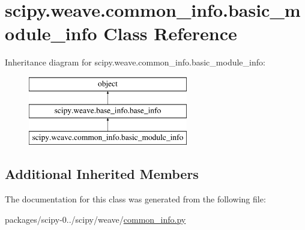 \hypertarget{classscipy_1_1weave_1_1common__info_1_1basic__module__info}{}\section{scipy.\+weave.\+common\+\_\+info.\+basic\+\_\+module\+\_\+info Class Reference}
\label{classscipy_1_1weave_1_1common__info_1_1basic__module__info}
Inheritance diagram for scipy.\+weave.\+common\+\_\+info.\+basic\+\_\+module\+\_\+info\+:\begin{figure}[H]
\begin{center}
\leavevmode
\includegraphics[height=3.000000cm]{classscipy_1_1weave_1_1common__info_1_1basic__module__info}
\end{center}
\end{figure}
\subsection*{Additional Inherited Members}


The documentation for this class was generated from the following file\+:\begin{DoxyCompactItemize}
\item 
packages/scipy-\/0../scipy/weave/\hyperlink{common__info_8py}{common\+\_\+info.\+py}\end{DoxyCompactItemize}
